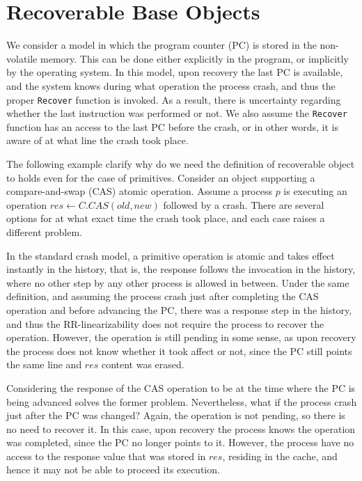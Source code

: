 
\section{Recoverable Base Objects}
\label{section: Recoverable Base Objects}

We consider a model in which the program counter (PC) is stored in the non-volatile memory. This can be done either explicitly in the program, or implicitly by the operating system. In this model, upon recovery the last PC is available, and the system knows during what operation the process crash, and thus the proper \texttt{Recover} function is invoked. As a result, there is uncertainty regarding whether the last instruction was performed or not. We also assume the \texttt{Recover} function has an access to the last PC before the crash, or in other words, it is aware of at what line the crash took place.

The following example clarify why do we need the definition of recoverable object to holds even for the case of primitives.
Consider an object supporting a compare-and-swap (CAS) atomic operation. Assume a process $p$ is executing an operation $res \leftarrow C.CAS(old,new)$ followed by a crash. There are several options for at what exact time the crash took place, and each case raises a different problem.

In the standard crash model, a primitive operation is atomic and takes effect instantly in the history, that is, the response follows the invocation in the history, where no other step by any other process is allowed in between. Under the same definition, and assuming the process crash just after completing the CAS operation and before advancing the PC, there was a response step in the history, and thus the RR-linearizability does not require the process to recover the operation. However, the operation is still pending in some sense, as upon recovery the process does not know whether it took affect or not, since the PC still points the same line and $res$ content was erased.

Considering the response of the CAS operation to be at the time where the PC is being advanced solves the former problem. Nevertheless, what if the process crash just after the PC was changed? Again, the operation is not pending, so there is no need to recover it. In this case, upon recovery the process knows the operation was completed, since the PC no longer points to it. However, the process have no access to the response value that was stored in $res$, residing in the cache, and hence it may not be able to proceed its execution.

